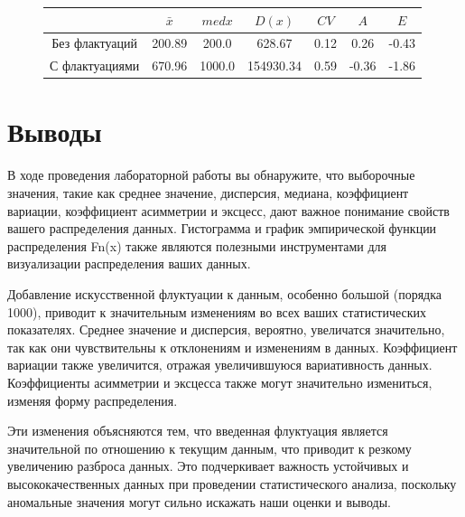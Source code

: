 \documentclass[12pt,a4paper]{article}
\begin{document}
\begin{figure}
		\begin{subtable}[htbp!]{0.8\textwidth}
			\centering
			\begin{tabular}{ |c|c|c|c|c|c|c| }
				\hline
				& \( \bar x \) & \( med x \) & \( D(x) \) & \( CV \) & \( A \) & \( E \) \\
				\hline
				Без флактуаций & 200.89 & 200.0 & 628.67 & 0.12 & 0.26 & -0.43 \\
				\hline
				С флактуациями & 670.96 & 1000.0 & 154930.34 & 0.59 & -0.36 & -1.86 \\
				\hline
			\end{tabular}
		\end{subtable}
	\end{figure}

	\newpage

	\section{Выводы}

	В ходе проведения лабораторной работы вы обнаружите, что выборочные значения, такие как среднее значение, дисперсия, медиана, коэффициент вариации, коэффициент асимметрии и эксцесс, дают важное понимание свойств вашего распределения данных. Гистограмма и график эмпирической функции распределения Fn(x) также являются полезными инструментами для визуализации распределения ваших данных.

	Добавление искусственной флуктуации к данным, особенно большой (порядка 1000), приводит к значительным изменениям во всех ваших статистических показателях. Среднее значение и дисперсия, вероятно, увеличатся значительно, так как они чувствительны к отклонениям и изменениям в данных. Коэффициент вариации также увеличится, отражая увеличившуюся вариативность данных. Коэффициенты асимметрии и эксцесса также могут значительно измениться, изменяя форму распределения.

	Эти изменения объясняются тем, что введенная флуктуация является значительной по отношению к текущим данным, что приводит к резкому увеличению разброса данных. Это подчеркивает важность устойчивых и высококачественных данных при проведении статистического анализа, поскольку аномальные значения могут сильно искажать наши оценки и выводы.
\end{document}
